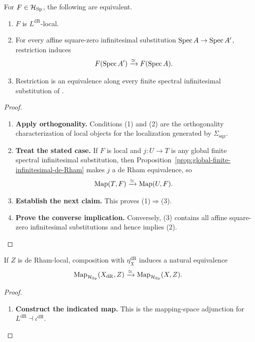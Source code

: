 \begin{theorem}
\label{thm:de-Rham-locality}
For \(F\in\mathcal H_{\operatorname{Sp}}\), the following are equivalent.
\begin{enumerate}
\item \(F\) is \(L^{\mathrm{dR}}\)-local.
\item For every affine square-zero infinitesimal substitution
\(\operatorname{Spec} A\to\operatorname{Spec} A'\), restriction induces
\[
  F(\operatorname{Spec} A')\xrightarrow{\simeq}F(\operatorname{Spec} A).
\]
\item Restriction is an equivalence along every finite spectral infinitesimal
substitution of .
\end{enumerate}
\end{theorem}

\begin{proof}
\leavevmode
\begin{enumerate}[label=\textup{(\arabic*)}]
    \item \textbf{Apply orthogonality.}
    Conditions \textup{(1)} and \textup{(2)} are the orthogonality characterization
    of local objects for the localization generated by
    \(\Sigma_{\mathrm{sqz}}\).
    \item \textbf{Treat the stated case.}
    If \(F\) is local and \(j:U\to T\) is any global
    finite spectral infinitesimal substitution, then
    Proposition~\ref{prop:global-finite-infinitesimal-de-Rham} makes \(j\) a de Rham
    equivalence, so
    \[
    \operatorname{Map}(T,F)\xrightarrow{\simeq}\operatorname{Map}(U,F).
    \]
    \item \textbf{Establish the next claim.}
    This proves \textup{(1)}\(\Rightarrow\)\textup{(3)}.
    \item \textbf{Prove the converse implication.}
    Conversely, \textup{(3)} contains all affine square-zero infinitesimal
    substitutions and hence implies \textup{(2)}.
\end{enumerate}
\end{proof}

\begin{proposition}
\label{prop:de-Rham-universal-mapping}
If \(Z\) is de Rham-local, composition with \(\eta_X^{\mathrm{dR}}\) induces a natural
equivalence
\[
  \operatorname{Map}_{\mathcal H_{\operatorname{Sp}}}(X_{\mathrm{dR}},Z)
  \xrightarrow{\simeq}
  \operatorname{Map}_{\mathcal H_{\operatorname{Sp}}}(X,Z).
\]
\end{proposition}

\begin{proof}
\leavevmode
\begin{enumerate}[label=\textup{(\arabic*)}]
    \item \textbf{Construct the indicated map.}
    This is the mapping-space adjunction for
    \(L^{\mathrm{dR}}\dashv\iota^{\mathrm{dR}}\).
\end{enumerate}
\end{proof}

